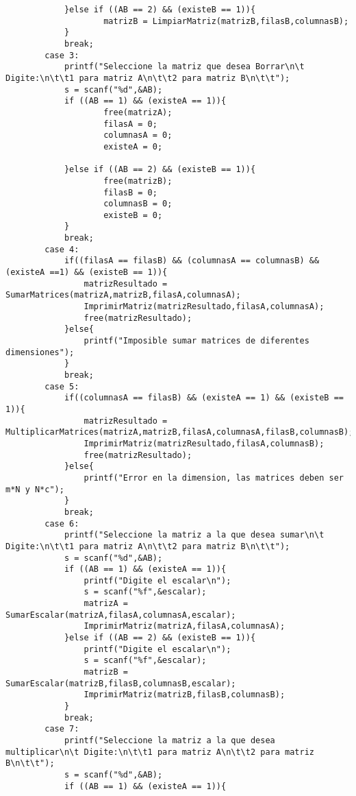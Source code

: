 \begin{verbatim}
            }else if ((AB == 2) && (existeB == 1)){
                    matrizB = LimpiarMatriz(matrizB,filasB,columnasB);
            }
            break;
        case 3:
            printf("Seleccione la matriz que desea Borrar\n\t Digite:\n\t\t1 para matriz A\n\t\t2 para matriz B\n\t\t");
            s = scanf("%d",&AB);
            if ((AB == 1) && (existeA == 1)){
                    free(matrizA);
                    filasA = 0;
                    columnasA = 0;
                    existeA = 0;
                
            }else if ((AB == 2) && (existeB == 1)){
                    free(matrizB);
                    filasB = 0;
                    columnasB = 0;
                    existeB = 0;
            }
            break;
        case 4:
            if((filasA == filasB) && (columnasA == columnasB) && (existeA ==1) && (existeB == 1)){
                matrizResultado = SumarMatrices(matrizA,matrizB,filasA,columnasA);
                ImprimirMatriz(matrizResultado,filasA,columnasA);
                free(matrizResultado);
            }else{
                printf("Imposible sumar matrices de diferentes dimensiones");
            }
            break;
        case 5:
            if((columnasA == filasB) && (existeA == 1) && (existeB == 1)){
                matrizResultado = MultiplicarMatrices(matrizA,matrizB,filasA,columnasA,filasB,columnasB);
                ImprimirMatriz(matrizResultado,filasA,columnasB);
                free(matrizResultado);
            }else{
                printf("Error en la dimension, las matrices deben ser m*N y N*c");
            }
            break;
        case 6:
            printf("Seleccione la matriz a la que desea sumar\n\t Digite:\n\t\t1 para matriz A\n\t\t2 para matriz B\n\t\t");
            s = scanf("%d",&AB);
            if ((AB == 1) && (existeA == 1)){
                printf("Digite el escalar\n");
                s = scanf("%f",&escalar);
                matrizA = SumarEscalar(matrizA,filasA,columnasA,escalar);
                ImprimirMatriz(matrizA,filasA,columnasA);
            }else if ((AB == 2) && (existeB == 1)){
                printf("Digite el escalar\n");
                s = scanf("%f",&escalar);
                matrizB = SumarEscalar(matrizB,filasB,columnasB,escalar);
                ImprimirMatriz(matrizB,filasB,columnasB);
            }
            break;
        case 7:
            printf("Seleccione la matriz a la que desea multiplicar\n\t Digite:\n\t\t1 para matriz A\n\t\t2 para matriz B\n\t\t");
            s = scanf("%d",&AB);
            if ((AB == 1) && (existeA == 1)){

\end{verbatim}

